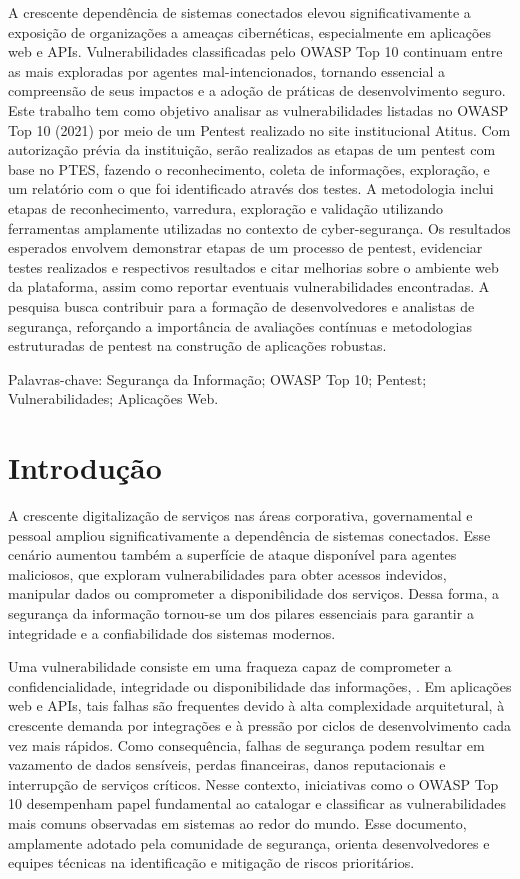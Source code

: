 \documentclass[12pt]{article}
\begin{document}
\begin{resumo}
  A crescente dependência de sistemas conectados elevou significativamente a exposição de organizações a ameaças cibernéticas, especialmente em aplicações web e APIs. 
  Vulnerabilidades classificadas pelo OWASP Top 10 continuam entre as mais exploradas por agentes mal-intencionados, tornando essencial a compreensão de seus impactos e a 
  adoção de práticas de desenvolvimento seguro. Este trabalho tem como objetivo analisar as vulnerabilidades listadas no OWASP Top 10 (2021) por meio de um Pentest realizado 
  no site institucional Atitus. Com autorização prévia da instituição, serão realizados as etapas de um pentest com base no PTES, fazendo o reconhecimento, coleta de informações, 
  exploração, e um relatório com o que foi identificado através dos testes. A metodologia inclui etapas de reconhecimento, varredura, exploração e validação utilizando ferramentas 
  amplamente utilizadas no contexto de cyber-segurança. Os resultados esperados envolvem demonstrar etapas de um processo de pentest, evidenciar testes realizados e respectivos 
  resultados e citar melhorias sobre o ambiente web da plataforma, assim como reportar eventuais vulnerabilidades encontradas. A pesquisa busca contribuir para a formação de 
  desenvolvedores e analistas de segurança, reforçando a importância de avaliações contínuas e metodologias estruturadas de pentest na construção de aplicações robustas.

    Palavras-chave: Segurança da Informação; OWASP Top 10; Pentest; Vulnerabilidades; Aplicações Web.
\end{resumo}

\section{Introdução}


    A crescente digitalização de serviços nas áreas corporativa, governamental e pessoal ampliou significativamente a dependência de sistemas conectados. 
Esse cenário aumentou também a superfície de ataque disponível para agentes maliciosos, que exploram vulnerabilidades para obter acessos indevidos, 
manipular dados ou comprometer a disponibilidade dos serviços. 
Dessa forma, a segurança da informação tornou-se um dos pilares essenciais para garantir a integridade e a confiabilidade dos sistemas modernos.

Uma vulnerabilidade consiste em uma fraqueza capaz de comprometer a confidencialidade, integridade ou disponibilidade das informações, \textcite{almeida}. 
Em aplicações web e APIs, tais falhas são frequentes devido à alta complexidade arquitetural, à crescente demanda por integrações e à pressão por ciclos 
de desenvolvimento cada vez mais rápidos. Como consequência, falhas de segurança podem resultar em vazamento de dados sensíveis, perdas financeiras, danos
 reputacionais e interrupção de serviços críticos.
Nesse contexto, iniciativas como o OWASP Top 10 desempenham papel fundamental ao catalogar e classificar as vulnerabilidades mais comuns observadas em sistemas ao redor do mundo. 
Esse documento, amplamente adotado pela comunidade de segurança, orienta desenvolvedores e equipes técnicas na identificação e mitigação de riscos prioritários.
\end{document}
